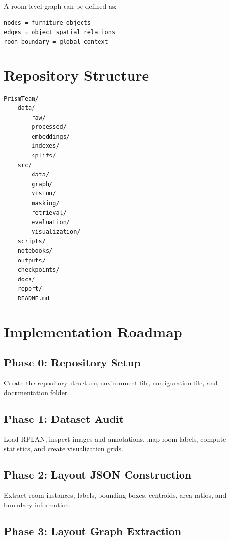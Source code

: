 \documentclass[11pt,a4paper]{article}
\begin{document}
A room-level graph can be defined as:
\begin{verbatim}
nodes = furniture objects
edges = object spatial relations
room boundary = global context
\end{verbatim}

\section{Repository Structure}

\begin{verbatim}
PrismTeam/
    data/
        raw/
        processed/
        embeddings/
        indexes/
        splits/
    src/
        data/
        graph/
        vision/
        masking/
        retrieval/
        evaluation/
        visualization/
    scripts/
    notebooks/
    outputs/
    checkpoints/
    docs/
    report/
    README.md
\end{verbatim}

\section{Implementation Roadmap}

\subsection{Phase 0: Repository Setup}

Create the repository structure, environment file, configuration file, and documentation folder.

\subsection{Phase 1: Dataset Audit}

Load RPLAN, inspect images and annotations, map room labels, compute statistics, and create visualization grids.

\subsection{Phase 2: Layout JSON Construction}

Extract room instances, labels, bounding boxes, centroids, area ratios, and boundary information.

\subsection{Phase 3: Layout Graph Extraction}
\end{document}
